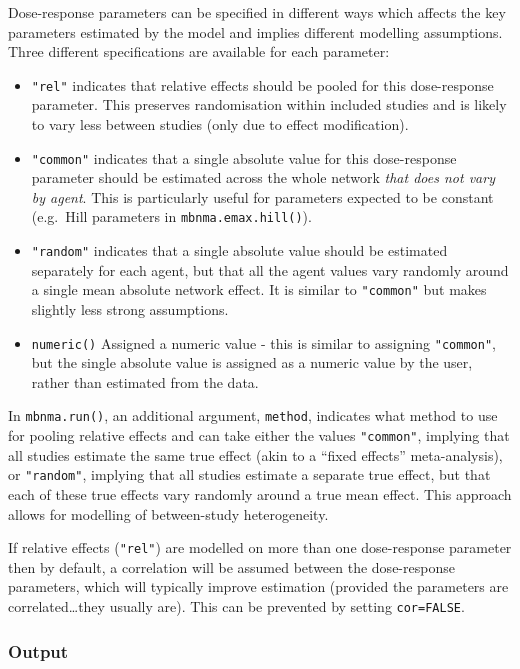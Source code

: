 \documentclass[]{article}
\providecommand{\tightlist}{%
  \setlength{\itemsep}{0pt}\setlength{\parskip}{0pt}}
\begin{document}
Dose-response parameters can be specified in different ways which
affects the key parameters estimated by the model and implies different
modelling assumptions. Three different specifications are available for
each parameter:

\begin{itemize}
\tightlist
\item
  \texttt{"rel"} indicates that relative effects should be pooled for
  this dose-response parameter. This preserves randomisation within
  included studies and is likely to vary less between studies (only due
  to effect modification).
\item
  \texttt{"common"} indicates that a single absolute value for this
  dose-response parameter should be estimated across the whole network
  \emph{that does not vary by agent}. This is particularly useful for
  parameters expected to be constant (e.g.~Hill parameters in
  \texttt{mbnma.emax.hill()}).
\item
  \texttt{"random"} indicates that a single absolute value should be
  estimated separately for each agent, but that all the agent values
  vary randomly around a single mean absolute network effect. It is
  similar to \texttt{"common"} but makes slightly less strong
  assumptions.
\item
  \texttt{numeric()} Assigned a numeric value - this is similar to
  assigning \texttt{"common"}, but the single absolute value is assigned
  as a numeric value by the user, rather than estimated from the data.
\end{itemize}

In \texttt{mbnma.run()}, an additional argument, \texttt{method},
indicates what method to use for pooling relative effects and can take
either the values \texttt{"common"}, implying that all studies estimate
the same true effect (akin to a ``fixed effects'' meta-analysis), or
\texttt{"random"}, implying that all studies estimate a separate true
effect, but that each of these true effects vary randomly around a true
mean effect. This approach allows for modelling of between-study
heterogeneity.

If relative effects (\texttt{"rel"}) are modelled on more than one
dose-response parameter then by default, a correlation will be assumed
between the dose-response parameters, which will typically improve
estimation (provided the parameters are correlated\ldots they usually
are). This can be prevented by setting \texttt{cor=FALSE}.

\hypertarget{output}{%
\subsubsection{Output}\label{output}}
\end{document}
